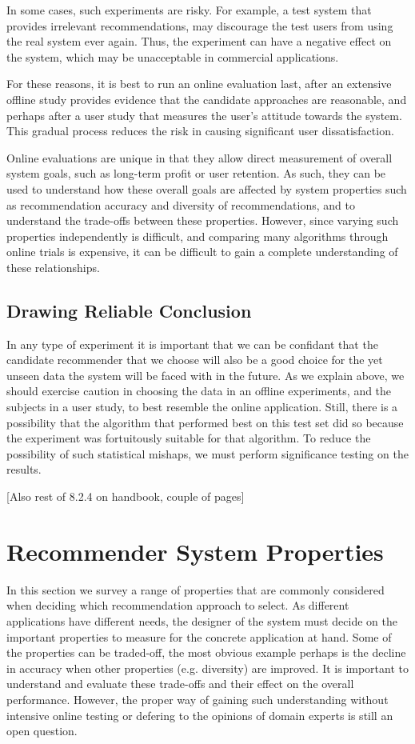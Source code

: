 In some cases, such experiments are risky. For example, a test system that provides irrelevant recommendations, may discourage the test users from using the real system ever again. Thus, the experiment can have a negative effect on the system, which may be unacceptable in commercial applications.

For these reasons, it is best to run an online evaluation last, after an extensive offline study provides evidence that the candidate approaches are reasonable, and perhaps after a user study that measures the user’s attitude towards the system. This gradual process reduces the risk in causing significant user dissatisfaction.

Online evaluations are unique in that they allow direct measurement of overall system goals, such as long-term profit or user retention. As such, they can be used to understand how these overall goals are affected by system properties such as recommendation accuracy and diversity of recommendations, and to understand the trade-offs between these properties. However, since varying such properties independently is difficult, and comparing many algorithms through online trials is expensive, it can be difficult to gain a complete understanding of these relationships.

\subsection{Drawing Reliable Conclusion}

In any type of experiment it is important that we can be confidant that the candidate recommender that we choose will also be a good choice for the yet unseen data the system will be faced with in the future. As we explain above, we should exercise caution in choosing the data in an offline experiments, and the subjects in a user study, to best resemble the online application. Still, there is a possibility that the algorithm that performed best on this test set did so because the experiment was fortuitously suitable for that algorithm. To reduce the possibility of such statistical mishaps, we must perform significance testing on the results.

[Also rest of 8.2.4 on handbook, couple of pages]

\section{Recommender System Properties}

In this section we survey a range of properties that are commonly considered when deciding which recommendation approach to select. As different applications have different needs, the designer of the system must decide on the important properties to measure for the concrete application at hand. Some of the properties can be traded-off, the most obvious example perhaps is the decline in accuracy when other properties (e.g. diversity) are improved. It is important to understand and evaluate these trade-offs and their effect on the overall performance. However, the proper way of gaining such understanding without intensive online testing or defering to the opinions of domain experts is still an open question.

